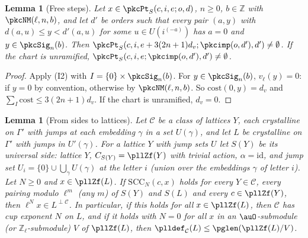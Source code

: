 \documentclass[10pt]{amsart}
\newtheorem{lemma}[theorem]{Lemma}
\theoremstyle{definition}
\theoremstyle{remark}
\newcommand{\Z}{\mathbb Z}
\begin{document}
\begin{lemma}[Free steps]\label{pkc:free}
Let $x\in\pkcPt_S(c,i,e;o,d)$, $n\ge0$, $b\in\Z$ with $\pkcNM(\ell,n,b)$, and let $d'$ be orders such
that every pair $(a,y)$ with $d(a,u)\le y<d'(a,u)$ for some $u\in U(i^{(-a)})$ has $a=0$ and $y\in
\pkcSig_n(b)$. Then $\pkcPt_S(c,i,e+3(2n+1)d_v;\pkcimp(o,d'),d')\ne\emptyset$. If the chart is
unramified, $\pkcPt_S(c,i,e;\pkcimp(o,d'),d')\ne\emptyset$.
\end{lemma}

\begin{proof}
Apply (I2) with $I=\{0\}\times\pkcSig_n(b)$. For $y\in\pkcSig_n(b)$, $v_\ell(y)=0$: if $y=0$ by
convention, otherwise by $\pkcNM(\ell,n,b)$. So $\mathrm{cost}(0,y)=d_v$ and $\sum_I\mathrm{cost}\le
3(2n+1)d_v$. If the chart is unramified, $d_v=0$.
\end{proof}

\begin{lemma}[From sides to lattices]\label{pkc:cup}
Let $\mathcal C$ be a class of lattices $Y$, each crystalline on $\Gamma'$ with jumps at each embedding
$\gamma$ in a set $U(\gamma)$, and let $L$ be crystalline on $\Gamma'$ with jumps in $U'(\gamma)$. For a
lattice $Y$ with jump sets $U$ let $S(Y)$ be its \emph{universal side}: lattice $Y$, $C_{S(Y)}=
\pllZf(Y)$ with trivial action, $\alpha=\mathrm{id}$, and jump set $U_i=\{0\}\cup\bigcup_{\gamma}U(\gamma)$
at the letter $i$ (union over the embeddings $\gamma$ of letter $i$). Let $N\ge0$ and $x\in\pllZf(L)$.
If $\mathrm{SCC}_N(c,x)$ holds for every $Y\in\mathcal C$, every pairing modulo $\ell^m$ (any $m$) of
$S(Y)$ and $S(L)$ and every $c\in\pllZf(Y)$, then $\ell^Nx\in L^{\perp\mathcal C}$.
In particular, if this holds for all $x\in\pllZf(L)$, then $\mathcal C$ has cup exponent $N$ on $L$,
and if it holds with $N=0$ for all $x$ in an $\auO$-submodule (or $\Z_\ell$-submodule) $V$ of
$\pllZf(L)$, then $\plldef_{\mathcal C}(L)\le\pglen(\pllZf(L)/V)$.
\end{lemma}
\end{document}
